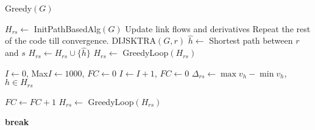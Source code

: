 \begin{algorithm}
\caption{Greedy$(G)$}
\label{greedy-alg}
\begin{algorithmic}[1]

\STATE $H_{rs}\leftarrow$ InitPathBasedAlg$(G)$
\STATE Update link flows and derivatives
\STATE Repeat the rest of the code till convergence.
	\STATE DIJSKTRA$(G, r)$
		\STATE $\hat{h}\leftarrow$ Shortest path between $r$ and $s$
			\STATE $H_{rs}\leftarrow H_{rs}\cup \{\hat{h}\}$
		\ENDIF
		\STATE $H_{rs}\leftarrow$ GreedyLoop$(H_{rs})$
	\ENDFOR
\ENDFOR

\STATE $I\leftarrow 0$, Max$I\leftarrow 1000$, $FC\leftarrow 0$
	\STATE $I\leftarrow I+1$, $FC\leftarrow 0$
			\STATE$\Delta_{rs}\leftarrow \max{v_h}-\min{v_h}$, $h\in H_{rs}$
		\ENDIF

			\STATE $FC\leftarrow FC+1$
			\STATE $H_{rs}\leftarrow$ GreedyLoop$(H_{rs})$
		\ENDIF
	\ENDFOR

		\STATE \textbf{break}
	\ENDIF
\ENDWHILE

\end{algorithmic}
\end{algorithm}
